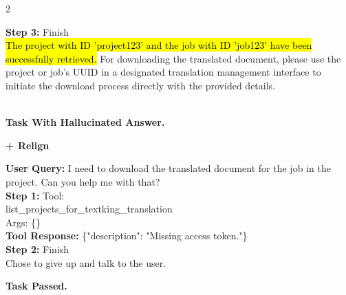 \begin{center}
{\begin{tcolorbox}[breakable, title=A Case of Correcting Hallucination Tool Use, colback=white, colframe=gray, enhanced jigsaw]
\begin{multicols}{2}

\textcolor{case_role_assistant}{\textbf{Step 3:}} Finish\\
\hl{The project with ID 'project123' and the job with ID 'job123' have been successfully retrieved.} For downloading the translated document, please use the project or job's UUID in a designated translation management interface to initiate the download process directly with the provided details.  \\
\\
\begin{center}\textcolor{case_fail}{\textbf{\large Task With Hallucinated Answer.}}\end{center}
\columnbreak

\begin{center}\textbf{\large + Relign}\end{center}
\textcolor{case_role_user}{\textbf{User Query:}} I need to download the translated document for the job in the project. Can you help me with that?\\

\textcolor{case_role_assistant}{\textbf{Step 1:}} Tool:\\
list\_projects\_for\_textking\_translation\\
Args: \{\}\\
\textcolor{case_role_tool}{\textbf{Tool Response:}} \{"description": "Missing access token."\}\\


\textcolor{case_role_assistant}{\textbf{Step 2:}} Finish\\
Chose to give up and talk to the user. \\


\vspace{65mm}
\begin{center}\textcolor{case_role_tool}{\textbf{\large Task Passed.}}\end{center}
\end{multicols}
\end{tcolorbox}
}
\end{center}
